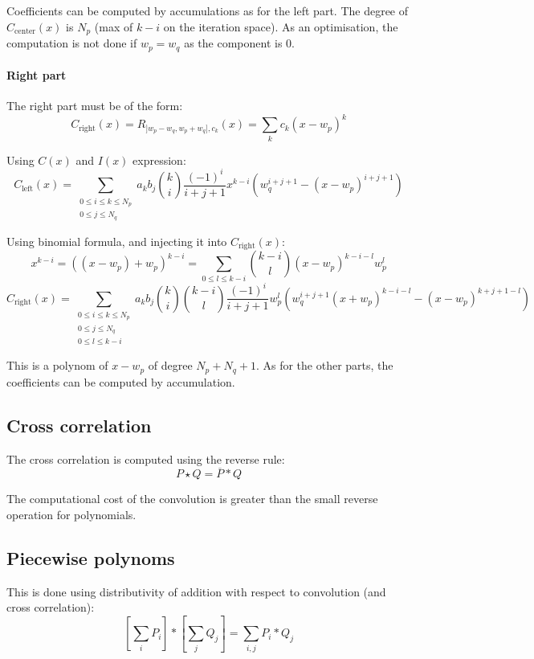 \documentclass[a4paper,10pt]{article}
\newcommand\Reversed[1]{\overline{#1}} %
\newcommand\Convolution{\ast}
\newcommand\Correlation{\star}
\begin{document}
Coefficients can be computed by accumulations as for the left part.
The degree of $C_\text{center}(x)$ is $N_p$ (max of $k-i$ on the iteration space).
As an optimisation, the computation is not done if $w_p = w_q$ as the component is $0$.

\paragraph{Right part}
The right part must be of the form:
\[ C_\text{right}(x) = R_{]w_p-w_q, w_p+w_q], c_k}(x) = \sum_k c_k (x - w_p)^k \]

Using $C(x)$ and $I(x)$ expression:
\[
    C_\text{left}(x) = \sum_{\substack{0 \le i \le k \le N_p \\ 0 \le j \le N_q}}
    a_k b_j \binom{k}{i} \frac{(-1)^i}{i+j+1} x^{k-i} \left( w_q^{i+j+1} - (x-w_p)^{i+j+1} \right)
\]

Using binomial formula, and injecting it into $C_\text{right}(x)$:
\[ x^{k-i} = ((x-w_p) + w_p)^{k-i} = \sum_{0 \le l \le k-i} \binom{k-i}{l} (x-w_p)^{k-i-l} w_p^l \]
\[
    C_\text{right}(x) = \sum_{\substack{0 \le i \le k \le N_p \\ 0 \le j \le N_q \\ 0 \le l \le k-i}}
    a_k b_j \binom{k}{i} \binom{k-i}{l} \frac{(-1)^i}{i+j+1} w_p^l \left( w_q^{i+j+1} (x+w_p)^{k-i-l} - (x-w_p)^{k+j+1-l} \right)
\]

This is a polynom of $x-w_p$ of degree $N_p + N_q + 1$.
As for the other parts, the coefficients can be computed by accumulation.

\subsection{Cross correlation}
The cross correlation is computed using the reverse rule:
\[ P \Correlation Q = \Reversed{P} \Convolution Q \]

The computational cost of the convolution is greater than the small reverse operation for polynomials.

\subsection{Piecewise polynoms}
This is done using distributivity of addition with respect to convolution (and cross correlation):
\[ \left[\sum_i P_i \right] \Convolution \left[\sum_j Q_j \right] = \sum_{i,j} P_i \Convolution Q_j \]

\end{document}
